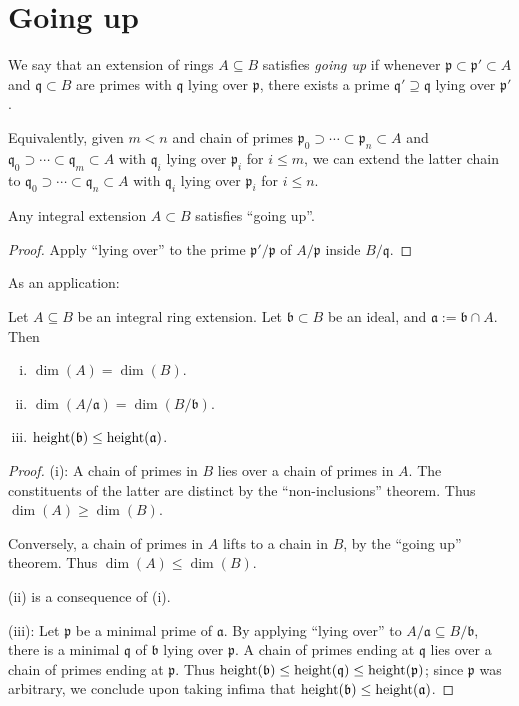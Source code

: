 \documentclass[reqno]{amsart}
\begin{document}
\section{Going up}
\label{sec:orgf2a76c1}

We say that an extension of rings \(A \subseteq B\) satisfies
\emph{going up} if whenever
\(\mathfrak{p} \subset \mathfrak{p} ' \subset A\) and
\(\mathfrak{q} \subset B\) are primes with \(\mathfrak{q}\) lying
over \(\mathfrak{p}\), there exists a prime
\(\mathfrak{q}' \supseteq \mathfrak{q}\) lying over
\(\mathfrak{p} '\).

Equivalently,
given \(m < n\) and chain of primes
\(\mathfrak{p}_0 \supset \dotsb \subset \mathfrak{p}_n \subset A\)
and
\(\mathfrak{q}_0 \supset \dotsb \subset \mathfrak{q}_m \subset A\)
with \(\mathfrak{q}_i\) lying over \(\mathfrak{p}_i\) for \(i \leq m\),
we can
extend the latter chain
to
\(\mathfrak{q}_0 \supset \dotsb \subset \mathfrak{q}_n \subset A\)
with \(\mathfrak{q}_i\) lying over \(\mathfrak{p}_i\) for \(i \leq
  n\).

\begin{theorem}
  Any integral extension $A \subset B$
  satisfies ``going up''.
\end{theorem}
\begin{proof}
  Apply ``lying over'' to the prime
  $\mathfrak{p} ' / \mathfrak{p}$ of $A/\mathfrak{p}$ inside
  $B/\mathfrak{q}$.
\end{proof}

As an application:
\begin{proposition}
  Let $A \subseteq B$ be an integral ring extension.
  Let $\mathfrak{b} \subset B$ be an ideal,
  and $\mathfrak{a} := \mathfrak{b} \cap A$.
  Then
  \begin{enumerate}[(i)]
  \item $\dim(A) = \dim(B)$.
  \item $\dim(A/\mathfrak{a}) = \dim(B/\mathfrak{b})$.
  \item $\operatorname{height}(\mathfrak{b}) \leq \operatorname{height}(\mathfrak{a})$.
  \end{enumerate}
\end{proposition}
\begin{proof}
  (i):
  A chain of primes in $B$ lies over a chain of primes in $A$.
  The constituents of the latter are distinct
  by the ``non-inclusions'' theorem.
  Thus $\dim(A) \geq \dim(B)$.

  Conversely, a chain of primes in $A$ lifts to a chain in $B$,
  by the ``going up'' theorem.
  Thus $\dim(A) \leq \dim(B)$.

  (ii) is a consequence of (i).

  (iii): Let $\mathfrak{p}$ be a minimal prime of
  $\mathfrak{a}$.  By applying ``lying over'' to
  $A/\mathfrak{a} \subseteq B/\mathfrak{b}$, there is a minimal
  $\mathfrak{q}$ of $\mathfrak{b}$ lying over $\mathfrak{p}$.  A
  chain of primes ending at $\mathfrak{q}$ lies over a chain of
  primes ending at $\mathfrak{p}$.  Thus
  $\operatorname{height}(\mathfrak{b}) \leq \operatorname{height}(\mathfrak{q}) \leq
  \operatorname{height}(\mathfrak{p})$; since $\mathfrak{p}$ was arbitrary, we
  conclude upon taking infima that
  $\operatorname{height}(\mathfrak{b}) \leq \operatorname{height}(\mathfrak{a})$.
\end{proof}
\end{document}
